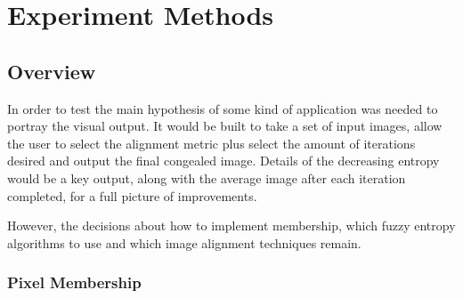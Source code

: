 \chapter{Experiment Methods}





\section{Overview}

In order to test the main hypothesis of  some kind of application was needed to portray the visual output. It would be built to take a set of input images, allow the user to select the alignment metric plus select the amount of iterations desired and output the final congealed image. Details of the decreasing entropy would be a key output, along with the average image after each iteration completed, for a full picture of improvements.

However, the decisions about how to implement membership, which fuzzy entropy algorithms to use and which image alignment techniques remain.

\subsection{Pixel Membership}
\label{sssec:member}

